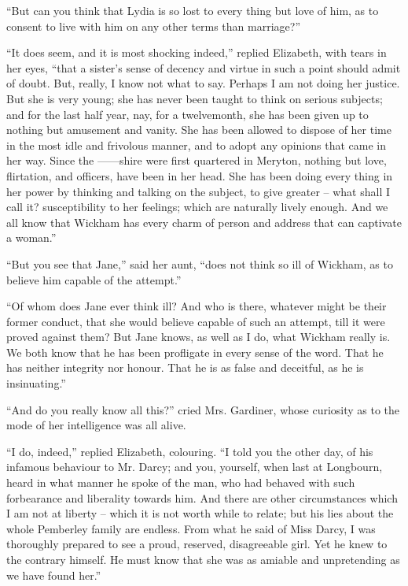 “But can you think that Lydia is so lost to every thing
but love of him, as to consent to live with him on any
other terms than marriage?”

“It does seem, and it is most shocking indeed,” replied
Elizabeth, with tears in her eyes, “that a sister’s sense
of decency and virtue in such a point should admit of
doubt. But, really, I know not what to say. Perhaps
I am not doing her justice. But she is very young; she
has never been taught to think on serious subjects; and
for the last half year, nay, for a twelvemonth, she has
been given up to nothing but amusement and vanity.
She has been allowed to dispose of her time in the most
idle and frivolous manner, and to adopt any opinions
that came in her way. Since the ------shire were first
quartered in Meryton, nothing but love, flirtation, and
officers, have been in her head. She has been doing
every thing in her power by thinking and talking on the
subject, to give greater -- what shall I call it? susceptibility
to her feelings; which are naturally lively enough.
And we all know that Wickham has every charm of
person and address that can captivate a woman.”

“But you see that Jane,” said her aunt, “does not
think so ill of Wickham, as to believe him capable of the
attempt.”

“Of whom does Jane ever think ill? And who is there,
whatever might be their former conduct, that she would
believe capable of such an attempt, till it were proved
against them? But Jane knows, as well as I do, what
Wickham really is. We both know that he has been
profligate in every sense of the word. That he has neither
integrity nor honour. That he is as false and deceitful,
as he is insinuating.”

“And do you really know all this?” cried Mrs.
Gardiner, whose curiosity as to the mode of her intelligence
was all alive.

“I do, indeed,” replied Elizabeth, colouring. “I told
you the other day, of his infamous behaviour to Mr. Darcy;
and you, yourself, when last at Longbourn, heard in what
manner he spoke of the man, who had behaved with such
forbearance and liberality towards him. And there are
other circumstances which I am not at liberty -- which it
is not worth while to relate; but his lies about the whole
Pemberley family are endless. From what he said of
Miss Darcy, I was thoroughly prepared to see a proud,
reserved, disagreeable girl. Yet he knew to the contrary
himself. He must know that she was as amiable and
unpretending as we have found her.”

